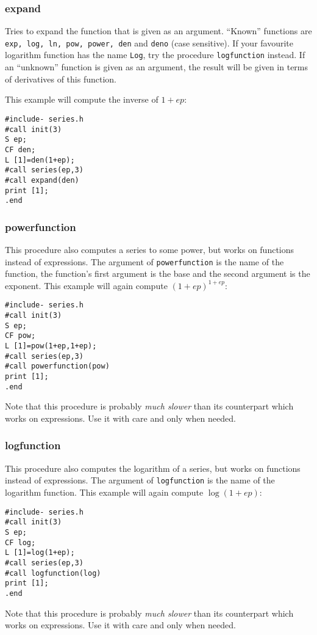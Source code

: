 \documentclass{article}
\begin{document}
\subsubsection{expand}
\label{sec:expand}

Tries to expand the function that is given as an argument. ``Known''
functions are {\tt exp, log, ln, pow, power, den} and {\tt deno} (case sensitive). If
your favourite logarithm function has the name {\tt Log}, try the
procedure {\tt logfunction} instead. If an ``unknown'' function is given
as an argument, the result will be given in terms of derivatives of this function.

This example will compute the
inverse of $1+ep$:
\begin{verbatim}
#include- series.h
#call init(3)
S ep;
CF den;
L [1]=den(1+ep);
#call series(ep,3)
#call expand(den)
print [1];
.end
\end{verbatim}

\subsubsection{powerfunction}
\label{sec:pow_fun}

This procedure also computes a series to some power, but works on
functions instead of expressions. The argument of {\tt powerfunction} is
the name of the function, the function's first argument is the base and
the second argument is the exponent. This example will again compute $(1+ep)^{1+ep}$:
\begin{verbatim}
#include- series.h
#call init(3)
S ep;
CF pow;
L [1]=pow(1+ep,1+ep);
#call series(ep,3)
#call powerfunction(pow)
print [1];
.end
\end{verbatim}
Note that this procedure is probably {\it much slower} than its
counterpart which works on expressions. Use it with care and only when needed.

\subsubsection{logfunction}
\label{sec:log_fun}

This procedure also computes the logarithm of a series, but works on
functions instead of expressions. The argument of {\tt logfunction} is
the name of the logarithm function. This example will again compute $\log(1+ep)$:
\begin{verbatim}
#include- series.h
#call init(3)
S ep;
CF log;
L [1]=log(1+ep);
#call series(ep,3)
#call logfunction(log)
print [1];
.end
\end{verbatim}
Note that this procedure is probably {\it much slower} than its
counterpart which works on expressions. Use it with care and only when needed.
\end{document}
